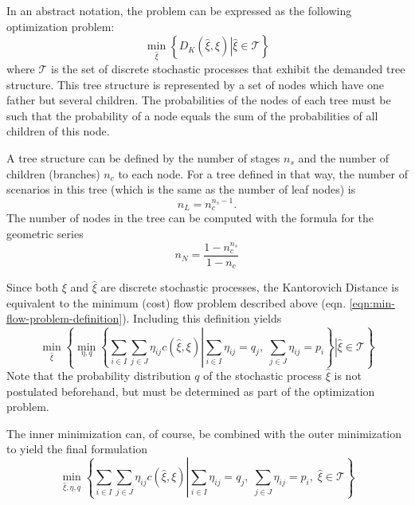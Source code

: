 \documentclass[a4paper, 12pt] {article}
\begin{document}
In an abstract notation, the problem can be expressed as the following optimization problem:
\begin{equation}
  \label{eq:symbolic-optimization-problem}
  \min_{\hat{\xi}}\left\{D_K(\hat{\xi}, \xi)\left|\hat{\xi} \in \mathcal{T}\right.\right\}
\end{equation}
where $\mathcal{T}$ is the set of discrete stochastic processes that exhibit the demanded tree structure. This tree structure is represented by a set of nodes which have one father but several children. The probabilities of the nodes of each tree must be such that the probability of a node equals the sum of the probabilities of all children of this node. 

A tree structure can be defined by the number of stages $n_s$ and the number of children (branches) $n_c$ to each node. For a tree defined in that way, the number of scenarios in this tree (which is the same as the number of leaf nodes) is
\begin{equation}
  \label{eq:number-of-leaf-nodes}
  n_L = n_c^{n_s-1}.
\end{equation}
The number of nodes in the tree can be computed with the formula for the geometric series
\begin{equation}
  \label{eq:number-of-nodes}
  n_N = \frac{1-n_c^{n_s}}{1-n_c}
\end{equation}

Since both $\xi$ and $\hat{\xi}$ are discrete stochastic processes, the Kantorovich Distance is equivalent to the minimum (cost) flow problem described above (eqn. \ref{eqn:min-flow-problem-definition}). Including this definition yields
\begin{equation}
  \label{eq:symbolic-optimization-with-minflow}
  \min_{\hat{\xi}}\left\{\min_{\eta,q}\left\{\sum_{i\in I}\sum_{j\in J}\eta_{ij}c(\hat{\xi}, \xi)\left|\sum_{i\in I}\eta_{ij}=q_j,\;\sum_{j\in J}\eta_{ij}=p_i\right.\right\}\left|\hat{\xi} \in \mathcal{T}\right.\right\}
\end{equation}
Note that the probability distribution $q$ of the stochastic process $\hat{\xi}$ is not postulated beforehand, but must be determined as part of the optimization problem. 

The inner minimization can, of course, be combined with the outer minimization to yield the final formulation
\begin{equation}
  \label{eq:symbolic-optimization-with-minflow2}
  \min_{\hat{\xi},\eta,q}\left\{\sum_{i\in I}\sum_{j\in J}\eta_{ij}c(\hat{\xi}, \xi)\left|\sum_{i\in I}\eta_{ij}=q_j,\;\sum_{j\in J}\eta_{ij}=p_i,\;\hat{\xi} \in \mathcal{T}\right.\right\}
\end{equation}
\end{document}
